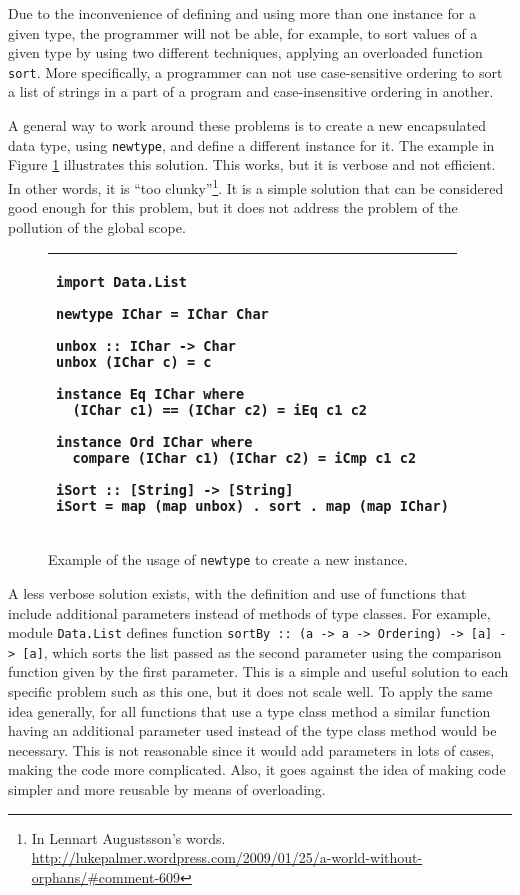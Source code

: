 \documentclass[msc]{ppgccufmg}
\begin{document}
Due to the inconvenience of defining and using more than one instance for a given type,
the programmer will not be able, for example, to sort values of a given type by using two
different techniques, applying an overloaded function \texttt{sort}.  More specifically, a
programmer can not use case-sensitive ordering to sort a list of strings in a part of a
program and case-insensitive ordering in another.

A general way to work around these problems is to create a new encapsulated data type, using \texttt{newtype}, and define a different instance for it.
The example in Figure \ref{newtype} illustrates this solution.  This works, but
it is verbose and not efficient.  In other words, it is ``too
clunky''\footnote{In Lennart Augustsson's
  words. \url{http://lukepalmer.wordpress.com/2009/01/25/a-world-without-orphans/\#comment-609}}.  It is a simple solution that can be considered good enough
for this problem, but it does not address the problem of the pollution of the global
scope.

\begin{figure}
\caption{Example of the usage of \texttt{newtype} to create a new
  instance.\label{newtype}}
\begin{tabular}{|p{\textwidth}|}
\hline
\begin{verbatim}
import Data.List

newtype IChar = IChar Char

unbox :: IChar -> Char
unbox (IChar c) = c

instance Eq IChar where
  (IChar c1) == (IChar c2) = iEq c1 c2

instance Ord IChar where
  compare (IChar c1) (IChar c2) = iCmp c1 c2

iSort :: [String] -> [String]
iSort = map (map unbox) . sort . map (map IChar)
\end{verbatim}
\\
\hline
\end{tabular}
\end{figure}

A less verbose solution exists, with the definition and use of
functions that include additional parameters instead of methods of
type classes. For example, module \texttt{Data.List} defines function
\texttt{sortBy :: (a -> a -> Ordering) -> [a] -> [a]}, which sorts the
list passed as the second parameter using the comparison function
given by the first parameter.  This is a simple and useful solution to
each specific problem such as this one, but it does not scale well.  To apply the same
idea generally, for all functions that use a type class method a
similar function having an additional parameter used instead of the
type class method would be necessary. This is not reasonable since it would add parameters in lots of cases, making the code
more complicated.  Also, it goes against the idea of making code
simpler and more reusable by means of overloading.
\end{document}
